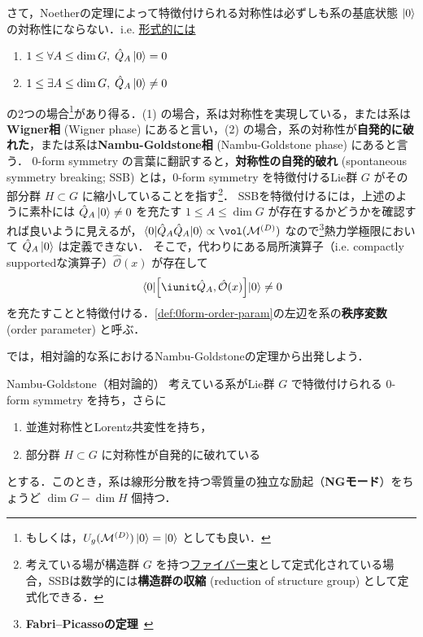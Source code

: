 \documentclass[TQFT_main]{subfiles}
\begin{document}
さて，Noetherの定理によって特徴付けられる対称性は必ずしも系の基底状態 $\ket{0}$ の対称性にならない．i.e. \underline{形式的には}
\begin{enumerate}
    \item $1 \le \forall A \le \dim G,\; \hat{Q}_A \ket{0} = 0$
    \item $1 \le \exists A \le \dim G,\; \hat{Q}_A \ket{0} \neq 0$
\end{enumerate}
の2つの場合\footnote{もしくは，$U_g(\mathcal{M}^{(D)}) \ket{0} = \ket{0}$ としても良い．}があり得る．(1) の場合，系は対称性を実現している，または系は\textbf{Wigner相} (Wigner phase) にあると言い，(2) の場合，系の対称性が\textbf{自発的に破れた}，または系は\textbf{Nambu-Goldstone相} (Nambu-Goldstone phase) にあると言う\cite[p.1]{Kugo1989qft2}．
$0$-form symmetry の言葉に翻訳すると，\textbf{対称性の自発的破れ} (spontaneous symmetry breaking; SSB) とは，$0$-form symmetry を特徴付けるLie群 $G$ がその部分群 $H \subset G$ に縮小していることを指す\footnote{考えている場が構造群 $G$ を持つ\hyperref[def.fiber-1]{ファイバー束}として定式化されている場合，SSBは数学的には\textbf{構造群の収縮} (reduction of structure group) として定式化できる．}．
SSBを特徴付けるには，上述のように素朴には $\hat{Q}_A \ket{0} \neq 0$ を充たす $1 \le A \le \dim G$ が存在するかどうかを確認すれば良いように見えるが，$\mel{0}{\hat{Q}_A \hat{Q}_A}{0} \propto \vol(\mfdcal{M}{D})$ なので\footnote{\textbf{Fabri–Picassoの定理}~\cite{FabriPicasso1966qft}}熱力学極限において $\hat{Q}_A\ket{0}$ は定義できない．
そこで，代わりにある局所演算子（i.e. compactly supportedな演算子）$\hat{\mathcal{O}}(x)$ が存在して
\begin{align}
    \label{def:0form-order-param}
    \mel{0}{\comm{\iunit \hat{Q}_A}{\hat{\mathcal{O}}(x)}}{0} \neq 0
\end{align}
を充たすことと特徴付ける．\eqref{def:0form-order-param}の左辺を系の\textbf{秩序変数} (order parameter) と呼ぶ．

では，相対論的な系におけるNambu-Goldstoneの定理から出発しよう．

\begin{mytheo}[label=thm:NG-relativistic]{Nambu-Goldstone（相対論的）}
    考えている系がLie群 $G$ で特徴付けられる $0$-form symmetry を持ち，さらに
    \begin{enumerate}
        \item 並進対称性とLorentz共変性を持ち，
        \item 部分群 $H \subset G$ に対称性が自発的に破れている
    \end{enumerate}
    とする．このとき，系は線形分散を持つ零質量の独立な励起（\textbf{NGモード}）をちょうど $\dim G - \dim H$ 個持つ．
\end{mytheo}
\end{document}
